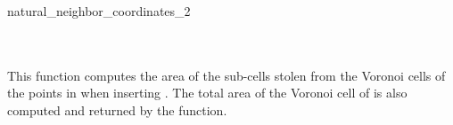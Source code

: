 \begin{ccRefFunction}{natural_neighbor_coordinates_2}
\ccSeeAlso
{} \\
\\ 
 \\

\ccImplementation This function computes the area of the sub-cells stolen from the
Voronoi cells of the points in  when inserting . The
total area of the Voronoi cell of  is also computed and
returned by the function.

\end{ccRefFunction}


